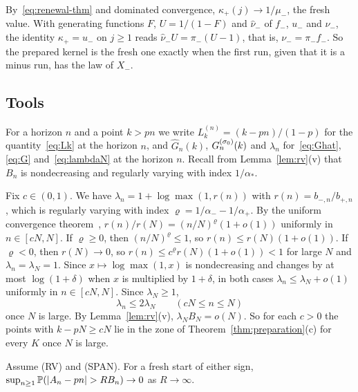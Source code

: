 \begin{remark}\label{rem:kappa-prep}
By~\eqref{eq:renewal-thm} and dominated convergence, $\kappa_\plus(j)\to1/\mu_\minus$,
the fresh value. With generating functions $F$, $U=1/(1-F)$ and $\widehat\nu_\minus$ of
$f_\minus$, $u_\minus$ and $\nu_\minus$, the identity $\kappa_\plus=u_\minus$ on $j\ge1$
reads $\widehat\nu_\minus U=\pi_\minus(U-1)$, that is, $\nu_\minus=\pi_\minus f_\minus$. So
the prepared kernel is the fresh one exactly when the first run, given that it is a
minus run, has the law of $X_\minus$.
\end{remark}

\subsection{Tools}\label{sec:prep-tools}

For a horizon $n$ and a point $k>pn$ we write $L^{(n)}_k=(k-pn)/(1-p)$ for the
quantity~\eqref{eq:Lk} at the horizon $n$, and $\widehat G_n(k)$, $G^{(\sigma_0)}_n(k)$
and $\lambda_n$ for~\eqref{eq:Ghat}, \eqref{eq:G} and~\eqref{eq:lambdaN} at the
horizon $n$. Recall from Lemma~\ref{lem:rv}(v) that $B_n$ is nondecreasing and
regularly varying with index $1/\alpha_*$.

Fix $c\in(0,1)$. We have $\lambda_n=1+\log\max(1,r(n))$ with
$r(n)=b_{\minus,n}/b_{\plus,n}$, which is regularly varying with index
$\varrho=1/\alpha_\minus-1/\alpha_\plus$. By the uniform convergence
theorem~\cite[Theorem~1.5.2]{bgt1989}, $r(n)/r(N)=(n/N)^{\varrho}(1+o(1))$ uniformly in
$n\in[cN,N]$. If $\varrho\ge0$, then $(n/N)^\varrho\le1$, so $r(n)\le r(N)(1+o(1))$.
If $\varrho<0$, then $r(N)\to0$, so $r(n)\le c^{\varrho}r(N)(1+o(1))<1$ for large $N$ and
$\lambda_n=\lambda_N=1$. Since $x\mapsto\log\max(1,x)$ is nondecreasing and changes by
at most $\log(1+\delta)$ when $x$ is multiplied by $1+\delta$, in both cases
$\lambda_n\le\lambda_N+o(1)$ uniformly in $n\in[cN,N]$. Since $\lambda_N\ge1$,
\begin{equation}\label{eq:lambda-unif}
 \lambda_n\le2\lambda_N\qquad(cN\le n\le N)
\end{equation}
once $N$ is large. By Lemma~\ref{lem:rv}(v), $\lambda_NB_N=o(N)$. So for each $c>0$
the points with $k-pN\ge cN$ lie in the zone of Theorem~\ref{thm:preparation}(c) for
every $K$ once $N$ is large.

\begin{lemma}\label{lem:prep-tight}
Assume (RV) and (SPAN). For a fresh start of either sign,
$\sup_{n\ge1}\Prob(|A_n-pn|>RB_n)\to0$ as $R\to\infty$.
\end{lemma}


